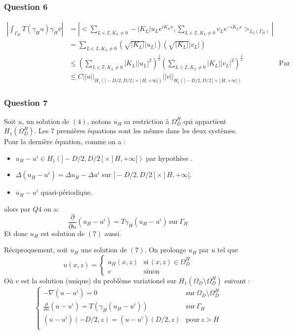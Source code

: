\documentclass{article}
\newcommand{\Q}[1]{\subsubsection*{Question #1}}
\begin{document}
\Q{6}

\begin{align*}
\left|\int_{\Gamma_H} T(\gamma_H u) \gamma_H \bar v \right| 
&= \left|<\sum_{L \in \mathbb Z, K_L \neq 0} -|K_L| u_L e^{i K_L x}, \sum_{L \in \mathbb Z, K_L \neq 0} v_L e^{-i K_L x}>_{L_2(\Gamma_H)}\right| \\
&= \sum_{L \in \mathbb Z, K_L \neq 0} (\sqrt{|K_L|} |u_L|) (\sqrt{|K_L|} |v_L|) \\
&\leq \left(\sum_{L \in \mathbb Z, K_L \neq 0} |K_L| |u_L|^2 \right)^{\frac{1}{2}}  \left(\sum_{L \in \mathbb Z, K_L \neq 0} |K_L| |v_L|^2 \right)^{\frac{1}{2}} &\text{Par C-S} \\
&\leq C ||u||_{H_1(]-D/2,D/2[ \times ]H, +\infty[)} ||v||_{H_1(]-D/2,D/2[ \times ]H, +\infty[)}
\end{align*}

\Q{7}
Soit $u$, un solution de $(4)$, notons $u_H$ sa restriction à $\Omega^H_D$ qui appartient $H_1(\Omega^H_D)$. Les 7 premières équations sont les mêmes dans les deux systèmes. 
Pour la dernière équation, comme on a :
\begin{itemize}
	\item $u_H - u^i \in H_1(]-D/2, D/2[ \times ]H, +\infty[)$ par hypothèse .
	\item $\Delta (u_H - u^i ) = \Delta u_H - \Delta u^i$ sur $]-D/2, D/2[ \times ]H, +\infty[$.
	\item $u_H - u^i$ quasi-périodique.
\end{itemize}

alors par $Q4$ on a: $$ \frac{\partial}{\partial n} (u_H - u^i) = T \gamma_H(u_H - u^i) \, \text{sur} \, \Gamma_H$$
Et donc $u_H$ est solution de $(7)$ aussi.

Réciproquement, soit $u_H$ une solution de $(7)$. On prolonge $u_H$ par $u$ tel que
$$
u(x, z) = 
\left\{
   \begin{array}{ll}
			u_H(x, z) & \mbox{si} \, (x, z) \in \Omega^H_D \\
			v & \mbox{sinon} 
   \end{array}
\right.
$$
Où $v$ est la solution (unique) du problème variationel sur $H_1(\Omega_D \setminus \Omega_D^H)$ suivant :
$$\left\{
   \begin{array}{ll}
			- \nabla (u - u^i) = 0 & \mbox{sur} \, \Omega_D \setminus \Omega_D^H \\
			\frac{\partial}{\partial n} (u-u^i) = T(\gamma_H(u_H-u^i))  & \mbox{sur} \, \Gamma_H  \\
			(u-u^i)(-D/2, z) = (u-u^i)(D/2, z)  & \mbox{pour} \, z > H  \\
   \end{array}
\right.
$$
\end{document}
